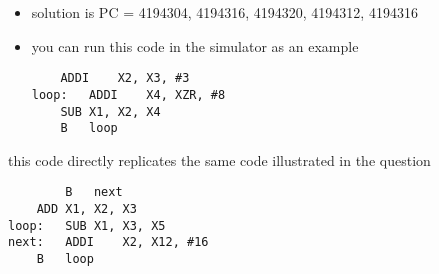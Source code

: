 \begin{frame}[fragile]
\BNotes\ifnum{}
\begin{itemize}
\item solution is PC = 4194304, 4194316, 4194320, 4194312, 4194316
\item you can run this code in the simulator as an example
\begin{verbatim}
    ADDI	X2, X3, #3
loop:	ADDI	X4, XZR, #8
	SUB	X1, X2, X4
	B	loop
\end{verbatim}
	
\end{itemize}
\item this code directly replicates the same code illustrated in the question
\begin{verbatim}
    	B	next
	ADD	X1, X2, X3
loop:	SUB	X1, X3, X5
next:	ADDI	X2, X12, #16
	B	loop
\end{verbatim}
\fi\ENotes
\end{frame}


